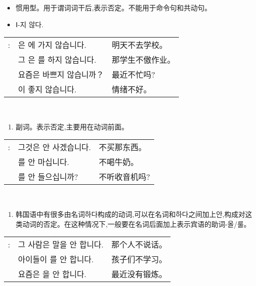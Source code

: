 \begin{grammar}
	\begin{grammarsect}[-지 않다]
		\begin{itemize}
			\item 惯用型。用于谓词词干后,表示否定。不能用于命令句和共动句。
			\item {\color{gray} Ⅰ-지 않다.}
		\end{itemize}
		\begin{tabular}{lll}
			\kr \ruby{例}{예}: &\kr  \ruby{來日}{내일}은 \ruby{學校}{학교}에 가지 않습니다.   & 明天不去学校。  \\
			             &\kr  그 \ruby{學生}{학생}은 \ruby{宿題}{숙제}를 하지 않습니다. & 那学生不傲作业。 \\
			             &\kr  요즘은 바쁘지 않습니까？                            & 最近不忙吗?   \\
			             &\kr  \ruby{氣分}{기분}이 좋지 않습니다.                  & 情绪不好。    \\
		\end{tabular}\\
	\end{grammarsect}
	\begin{grammarsect}[안]
		\begin{enumerate}
			\item 副词。表示否定,主要用在动词前面。
		\end{enumerate}
		\begin{tabular}{lll}
			\kr \ruby{例}{예}: &\kr  그것은 안 사겠습니다.                & 不买那东西。  \\
			             & \kr \ruby{牛乳}{우유}를 안 마십니다.      & 不喝牛奶。   \\
			             & \kr \ruby{라디오}{radio}를 안 들으십니까? & 不听收音机吗? \\
		\end{tabular}\\
	\end{grammarsect}
	\begin{enumerate}
		\item 韩国语中有很多由名词하다构成的动词,可以在名词和하다之间加上안,构成对这类动词的否定。在这种情况下,一般要在名词后面加上表示宾语的助词-올/룰。
	\end{enumerate}
	\begin{tabular}{lll}
		\kr \ruby{例}{예}: & \kr 그 사람은 말을 안 합니다.             & 那个人不说话。 \\
		              & \kr 아이들이 \ruby{工夫}{공부}를 안 합니다.  & 孩子们不学习。 \\
		              & \kr 요즘은 \ruby{運動}{운동}을 안 합니다. & 最近没有锻炼。 \\
	\end{tabular}\\
\end{grammar}
